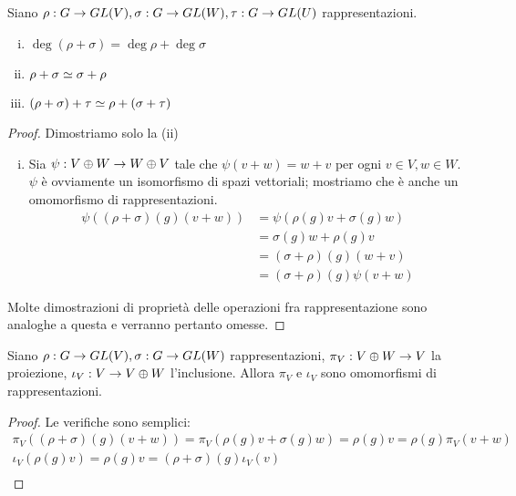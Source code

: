 \begin{proposition}
Siano $\rho:G\to GL(V),\allowbreak\sigma:G\to GL(W),\allowbreak\tau:G\to GL(U)$ rappresentazioni.
\begin{enumerate}[(i)]
\item $\deg(\rho+\sigma)=\deg\rho+\deg\sigma$
\item $\rho+\sigma\simeq\sigma+\rho$
\item $(\rho+\sigma)+\tau\simeq\rho+(\sigma+\tau)$
\end{enumerate}
\end{proposition}
\begin{proof}
Dimostriamo solo la (ii)
\begin{enumerate}[(i)]
\addtocounter{enumi}{1}
\item Sia $\psi:V\oplus W\to W\oplus V$ tale che $\psi(v+w)=w+v$ per ogni $v\in V\comma w\in W$. $\psi$ è ovviamente un isomorfismo di spazi vettoriali; mostriamo che è anche un omomorfismo di rappresentazioni.
\begin{align*}
\psi((\rho+\sigma)(g)(v+w))&=\psi(\rho(g)v+\sigma(g)w)\\
&=\sigma(g)w+\rho(g)v\\
&=(\sigma+\rho)(g)(w+v)\\
&=(\sigma+\rho)(g)\psi(v+w)
\end{align*}
\end{enumerate}
Molte dimostrazioni di proprietà delle operazioni fra rappresentazione sono analoghe a questa e verranno pertanto omesse.
\end{proof}

\begin{proposition}
Siano $\rho:G\to GL(V),\allowbreak\sigma:G\to GL(W)$ rappresentazioni, $\pi_V:V\oplus W\to V$ la proiezione, $\iota_V:V\to V\oplus W$ l'inclusione. Allora $\pi_V$ e $\iota_V$ sono omomorfismi di rappresentazioni.
\end{proposition}
\begin{proof}
Le verifiche sono semplici:
\begin{multline*}
\pi_V((\rho+\sigma)(g)(v+w))=\pi_V(\rho(g)v+\sigma(g)w)=\rho(g)v=\rho(g)\pi_V(v+w)\\
\iota_V(\rho(g)v)=\rho(g)v=(\rho+\sigma)(g)\iota_V(v)\\
\end{multline*}
\end{proof}

